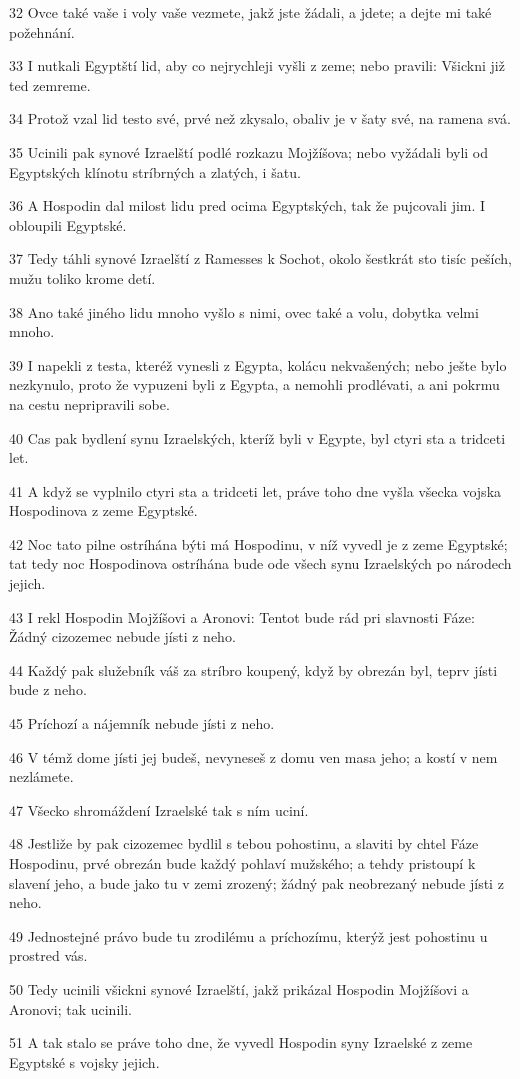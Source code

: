 \par 32 Ovce také vaše i voly vaše vezmete, jakž jste žádali, a jdete; a dejte mi také požehnání.
\par 33 I nutkali Egyptští lid, aby co nejrychleji vyšli z zeme; nebo pravili: Všickni již ted zemreme.
\par 34 Protož vzal lid testo své, prvé než zkysalo, obaliv je v šaty své, na ramena svá.
\par 35 Ucinili pak synové Izraelští podlé rozkazu Mojžíšova; nebo vyžádali byli od Egyptských klínotu stríbrných a zlatých, i šatu.
\par 36 A Hospodin dal milost lidu pred ocima Egyptských, tak že pujcovali jim. I obloupili Egyptské.
\par 37 Tedy táhli synové Izraelští z Ramesses k Sochot, okolo šestkrát sto tisíc peších, mužu toliko krome detí.
\par 38 Ano také jiného lidu mnoho vyšlo s nimi, ovec také a volu, dobytka velmi mnoho.
\par 39 I napekli z testa, kteréž vynesli z Egypta, kolácu nekvašených; nebo ješte bylo nezkynulo, proto že vypuzeni byli z Egypta, a nemohli prodlévati, a ani pokrmu na cestu nepripravili sobe.
\par 40 Cas pak bydlení synu Izraelských, kteríž byli v Egypte, byl ctyri sta a tridceti let.
\par 41 A když se vyplnilo ctyri sta a tridceti let, práve toho dne vyšla všecka vojska Hospodinova z zeme Egyptské.
\par 42 Noc tato pilne ostríhána býti má Hospodinu, v níž vyvedl je z zeme Egyptské; tat tedy noc Hospodinova ostríhána bude ode všech synu Izraelských po národech jejich.
\par 43 I rekl Hospodin Mojžíšovi a Aronovi: Tentot bude rád pri slavnosti Fáze: Žádný cizozemec nebude jísti z neho.
\par 44 Každý pak služebník váš za stríbro koupený, když by obrezán byl, teprv jísti bude z neho.
\par 45 Príchozí a nájemník nebude jísti z neho.
\par 46 V témž dome jísti jej budeš, nevyneseš z domu ven masa jeho; a kostí v nem nezlámete.
\par 47 Všecko shromáždení Izraelské tak s ním uciní.
\par 48 Jestliže by pak cizozemec bydlil s tebou pohostinu, a slaviti by chtel Fáze Hospodinu, prvé obrezán bude každý pohlaví mužského; a tehdy pristoupí k slavení jeho, a bude jako tu v zemi zrozený; žádný pak neobrezaný nebude jísti z neho.
\par 49 Jednostejné právo bude tu zrodilému a príchozímu, kterýž jest pohostinu u prostred vás.
\par 50 Tedy ucinili všickni synové Izraelští, jakž prikázal Hospodin Mojžíšovi a Aronovi; tak ucinili.
\par 51 A tak stalo se práve toho dne, že vyvedl Hospodin syny Izraelské z zeme Egyptské s vojsky jejich.

